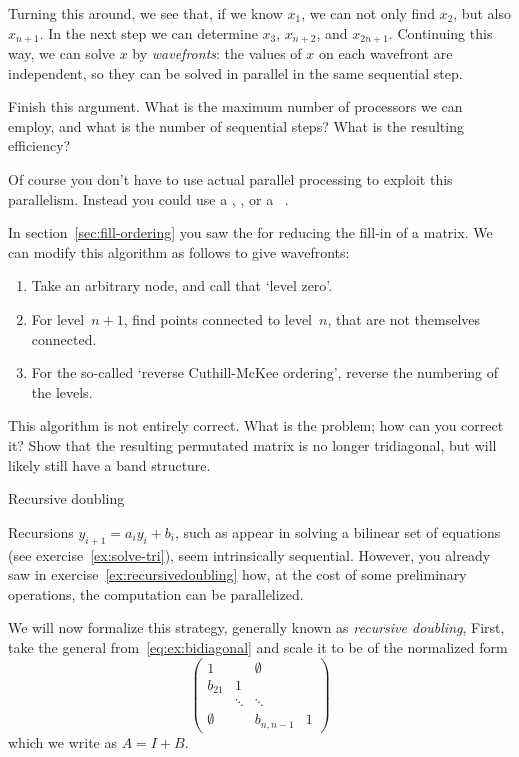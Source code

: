 Turning this around, we see that, if we know $x_1$, we can not only
find $x_2$, but also $x_{n+1}$. In the next step we can determine
$x_3$, $x_{n+2}$, and $x_{2n+1}$. Continuing this way, we can solve
$x$ by \emph{wavefronts}: the values of $x$ on each wavefront are
independent, so they can be solved in parallel in the same sequential
step.

\begin{exercise}
  Finish this argument. What is the maximum number of processors we
  can employ, and what is the number of sequential steps? What is the
  resulting efficiency?
\end{exercise}

Of course you don't have to use actual parallel processing
to exploit this parallelism. Instead you could use a
, ,
or a ~\cite{Liu:cudasw2009}.

In section~\ref{sec:fill-ordering} you saw the
 for reducing the fill-in of a
matrix. We can modify this algorithm as follows to give wavefronts:
\begin{enumerate}
\item Take an arbitrary node, and call that `level zero'.
\item For level~$n+1$, find points connected to
  level~$n$, that are not themselves connected.
\item For the so-called `reverse Cuthill-McKee ordering', reverse the
  numbering of the levels.
\end{enumerate}
\begin{exercise}
  This algorithm is not entirely correct. What is the problem; how can
  you correct it? Show that the resulting permutated matrix is no
  longer tridiagonal, but will likely still have a band structure.
\end{exercise}

 {Recursive doubling}
\label{sec:recdouble}

Recursions $y_{i+1} = a_i  y_i + b_i $,
such as appear in solving a bilinear set of equations
(see exercise~\ref{ex:solve-tri}),
seem intrinsically sequential.
However, you  already saw in
exercise~\ref{ex:recursivedoubling} how, at the cost of some preliminary
operations, the computation can be parallelized.

We will now formalize this strategy, generally known as
\emph{recursive doubling},  First, take the general
from~\eqref{eq:ex:bidiagonal} and scale it to be of the normalized form
\[ 
  \begin{pmatrix}
    1&&\emptyset\\ b_{21}&1\\ &\ddots&\ddots\\ 
    \emptyset&&b_{n,n-1}&1
  \end{pmatrix}
\]
which we write as $A=I+B$.

